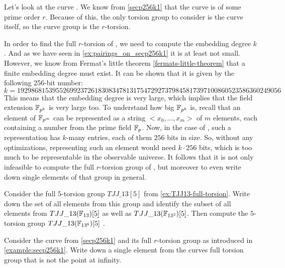 \begin{example} 
\label{example:secp256k1}
Let's look at the curve . We know from \examplename{} \ref{secp256k1} that the curve is of some prime order $r$. Because of this, the only torsion group to consider is the curve itself, so the curve group is the $r$-torsion. 

In order to find the full $r$-torsion of , we need to compute the embedding degree $k$. And as we have seen in \ref{ex:pairings_on_secp256k1} it is at least not small. However, we know from Fermat's little theorem \ref{fermats-little-theorem} that a finite embedding degree must exist. It can be shown that it is given by the following 256-bit number:
$$
k = \scriptstyle 192986815395526992372618308347813175472927379845817397100860523586360249056 
$$
This means that the embedding degree is very large, which implies that the field extension $\mathbb{F}_{p^k}$ is very large too. To understand how big $\mathbb{F}_{p^k}$ is, recall that an element of $\mathbb{F}_{p^m}$ can be represented as a string $<x_0,\ldots,x_m>$ of $m$ elements, each containing a number from the prime field $\mathbb{F}_p$. Now, in the case of , such a representation has $k$-many entries, each of them $256$ bits in size. So, without any optimizations, representing such an element would need $k\cdot 256$ bits, which is too much to be representable in the observable universe. It follows that it is not only infeasible to compute the full $r$-torsion group of , but moreover to even write down single elements of that group in general. 
\end{example}
\begin{exercise} Consider the full $5$-torsion group $TJJ\_13[5]$ from \examplename{} \ref{ex:TJJ13-full-torsion}. Write down the set of all elements from this group and identify the subset of all elements from $TJJ\_13(\mathbb{F}_{13})[5]$ as well as $TJJ\_13(\mathbb{F}_{13^2})[5]$. Then compute the $5$-torsion group $TJJ\_13(\mathbb{F}_{13^{8}})[5]$ .
\end{exercise}
\begin{exercise} Consider the curve  from \examplename{} \ref{secp256k1} and its full $r$-torsion group as introduced in \examplename{} \ref{example:secp256k1}. Write down a single element from the curves full torsion group that is not the point at infinity.
\end{exercise}

